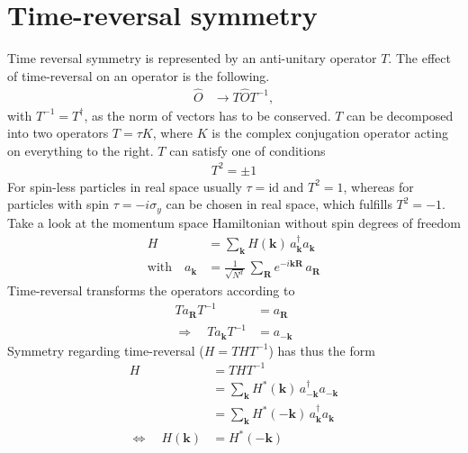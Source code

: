 \section*{Time-reversal symmetry}
Time reversal symmetry is represented by an anti-unitary operator $T$. The effect of time-reversal on an operator is the following.
\begin{align*}
    \hat{O}&\rightarrow T\hat{O}T^{-1},
\end{align*} 
with $T^{-1}=T^\dagger$, as the norm of vectors has to be conserved. $T$ can be decomposed into two operators $T=\tau K$, where $K$ is the complex conjugation operator acting on everything to the right. $T$ can satisfy one of conditions
\begin{align*}
    T^2=\pm1
\end{align*}
For spin-less particles in real space usually $\tau=\text{id}$ and $T^2=1$, whereas for particles with spin $\tau=-i\sigma_y$ can be chosen in real space, which fulfills $T^2=-1$.\\
Take a look at the momentum space Hamiltonian without spin degrees of freedom
\begin{align*}
    H &= \sum_\mathbf{k} H(\mathbf{k})\,a_\mathbf{k}^\dagger a_\mathbf{k}\\
    \text{with}\quad a_\mathbf{k}&=\frac{1}{\sqrt{N^d}}\,\sum_\mathbf{R} e^{-i\mathbf{k}\mathbf{R}}\,a_\mathbf{R}
\end{align*}
Time-reversal transforms the operators according to
\begin{align*}
    Ta_\mathbf{R}T^{-1}&=a_{\mathbf{R}}\\
    \Rightarrow\quad Ta_\mathbf{k}T^{-1}&=a_{-\mathbf{k}}
\end{align*}
Symmetry regarding time-reversal ($H = THT^{-1}$) has thus the form
\begin{align*}
    H &= THT^{-1}\\
    &= \sum_\mathbf{k} H^*(\mathbf{k})\,a_{-\mathbf{k}}^\dagger a_{-\mathbf{k}}\\
    &= \sum_\mathbf{k} H^*(-\mathbf{k})\,a_\mathbf{k}^\dagger a_\mathbf{k}\\
    \iff\quad H(\mathbf{k})&= H^*(-\mathbf{k})
\end{align*}

